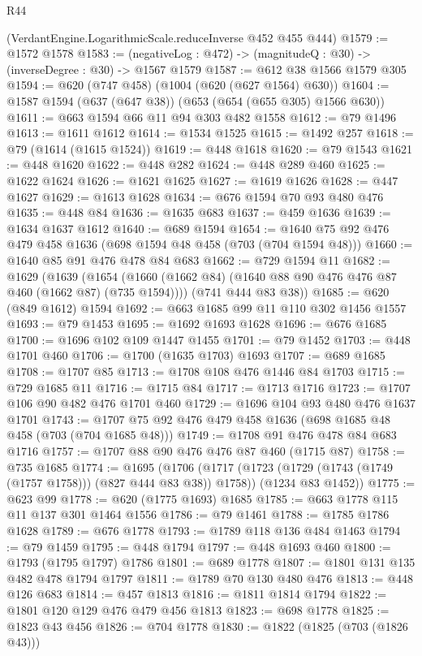\begin{lexlean}{R44}
\begin{coremodule}
    (VerdantEngine.LogarithmicScale.reduceInverse @452 @455 @444)
@1579 := @1572 @1578
@1583 := (negativeLog : @472) -> (magnitudeQ : @30) -> (inverseDegree : @30) -> @1567 @1579
@1587 := @612 @38 @1566 @1579 @305
@1594 := @620 (@747 @458) (@1004 (@620 (@627 @1564) @630))
@1604 := @1587 @1594 (@637 (@647 @38)) (@653 (@654 (@655 @305) @1566 @630))
@1611 := @663 @1594 @66 @11 @94 @303 @482 @1558
@1612 := @79 @1496
@1613 := @1611 @1612
@1614 := @1534 @1525
@1615 := @1492 @257
@1618 := @79 (@1614 (@1615 @1524))
@1619 := @448 @1618
@1620 := @79 @1543
@1621 := @448 @1620
@1622 := @448 @282
@1624 := @448 @289 @460
@1625 := @1622 @1624
@1626 := @1621 @1625
@1627 := @1619 @1626
@1628 := @447 @1627
@1629 := @1613 @1628
@1634 := @676 @1594 @70 @93 @480 @476
@1635 := @448 @84
@1636 := @1635 @683
@1637 := @459 @1636
@1639 := @1634 @1637 @1612
@1640 := @689 @1594
@1654 := @1640 @75 @92 @476 @479 @458 @1636 (@698 @1594 @48 @458 (@703 (@704 @1594 @48)))
@1660 := @1640 @85 @91 @476 @478 @84 @683
@1662 := @729 @1594 @11
@1682 := @1629
    (@1639
      (@1654 (@1660 (@1662 @84) (@1640 @88 @90 @476 @476 @87 @460 (@1662 @87) (@735 @1594))))
      (@741 @444 @83 @38))
@1685 := @620 (@849 @1612) @1594
@1692 := @663 @1685 @99 @11 @110 @302 @1456 @1557
@1693 := @79 @1453
@1695 := @1692 @1693 @1628
@1696 := @676 @1685
@1700 := @1696 @102 @109 @1447 @1455
@1701 := @79 @1452
@1703 := @448 @1701 @460
@1706 := @1700 (@1635 @1703) @1693
@1707 := @689 @1685
@1708 := @1707 @85
@1713 := @1708 @108 @476 @1446 @84 @1703
@1715 := @729 @1685 @11
@1716 := @1715 @84
@1717 := @1713 @1716
@1723 := @1707 @106 @90 @482 @476 @1701 @460
@1729 := @1696 @104 @93 @480 @476 @1637 @1701
@1743 := @1707 @75 @92 @476 @479 @458 @1636 (@698 @1685 @48 @458 (@703 (@704 @1685 @48)))
@1749 := @1708 @91 @476 @478 @84 @683 @1716
@1757 := @1707 @88 @90 @476 @476 @87 @460 (@1715 @87)
@1758 := @735 @1685
@1774 := @1695
    (@1706
      (@1717 (@1723 (@1729 (@1743 (@1749 (@1757 @1758))) (@827 @444 @83 @38)) @1758))
      (@1234 @83 @1452))
@1775 := @623 @99
@1778 := @620 (@1775 @1693) @1685
@1785 := @663 @1778 @115 @11 @137 @301 @1464 @1556
@1786 := @79 @1461
@1788 := @1785 @1786 @1628
@1789 := @676 @1778
@1793 := @1789 @118 @136 @484 @1463
@1794 := @79 @1459
@1795 := @448 @1794
@1797 := @448 @1693 @460
@1800 := @1793 (@1795 @1797) @1786
@1801 := @689 @1778
@1807 := @1801 @131 @135 @482 @478 @1794 @1797
@1811 := @1789 @70 @130 @480 @476
@1813 := @448 @126 @683
@1814 := @457 @1813
@1816 := @1811 @1814 @1794
@1822 := @1801 @120 @129 @476 @479 @456 @1813
@1823 := @698 @1778
@1825 := @1823 @43 @456
@1826 := @704 @1778
@1830 := @1822 (@1825 (@703 (@1826 @43)))

\end{coremodule}
\end{lexlean}
